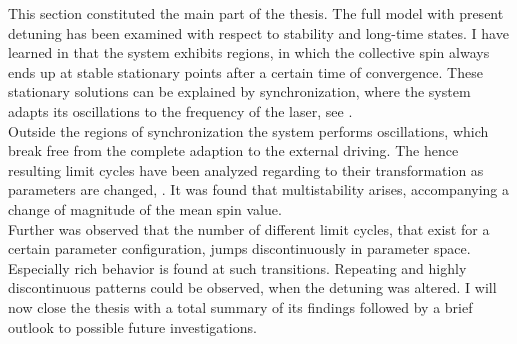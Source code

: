 This section constituted the main part of the thesis. The full model with present detuning has been examined with respect to stability and long-time states. I have learned in  that the system exhibits regions, in which the collective spin always ends up at stable stationary points after a certain time of convergence. These stationary solutions can be explained by synchronization, where the system adapts its oscillations to the frequency of the laser, see . \\Outside the regions of synchronization the system performs oscillations, which break free from the complete adaption to the external driving. The hence resulting limit cycles have been analyzed regarding to their transformation as parameters are changed, . It was found that multistability arises, accompanying a change of magnitude of the mean spin value. \\Further was observed that the number of different limit cycles, that exist for a certain parameter configuration, jumps discontinuously in parameter space. Especially rich behavior is found at such transitions. Repeating and highly discontinuous patterns could be observed, when the detuning was altered. I will now close the thesis with a total summary of its findings followed by a brief outlook to possible future investigations.


